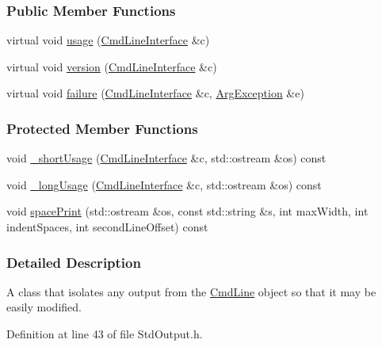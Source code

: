 \subsubsection*{Public Member Functions}
\begin{DoxyCompactItemize}
\item 
virtual void \hyperlink{classTCLAP_1_1StdOutput_aeb10eb400e0ee45f2cde689bef606b49}{usage} (\hyperlink{classTCLAP_1_1CmdLineInterface}{Cmd\+Line\+Interface} \&c)
\item 
virtual void \hyperlink{classTCLAP_1_1StdOutput_a768111a59af4753ac6e5ace3ec99482e}{version} (\hyperlink{classTCLAP_1_1CmdLineInterface}{Cmd\+Line\+Interface} \&c)
\item 
virtual void \hyperlink{classTCLAP_1_1StdOutput_a9afc267e012c3ac42c8b1afe01f98556}{failure} (\hyperlink{classTCLAP_1_1CmdLineInterface}{Cmd\+Line\+Interface} \&c, \hyperlink{classTCLAP_1_1ArgException}{Arg\+Exception} \&e)
\end{DoxyCompactItemize}
\subsubsection*{Protected Member Functions}
\begin{DoxyCompactItemize}
\item 
void \hyperlink{classTCLAP_1_1StdOutput_a60fa57587838d506d907f08800f2631c}{\+\_\+short\+Usage} (\hyperlink{classTCLAP_1_1CmdLineInterface}{Cmd\+Line\+Interface} \&c, std\+::ostream \&os) const 
\item 
void \hyperlink{classTCLAP_1_1StdOutput_ace725aebd685c16f464d697e85e0327d}{\+\_\+long\+Usage} (\hyperlink{classTCLAP_1_1CmdLineInterface}{Cmd\+Line\+Interface} \&c, std\+::ostream \&os) const 
\item 
void \hyperlink{classTCLAP_1_1StdOutput_a38661be8895e07c442c2c3138b7444a2}{space\+Print} (std\+::ostream \&os, const std\+::string \&s, int max\+Width, int indent\+Spaces, int second\+Line\+Offset) const 
\end{DoxyCompactItemize}


\subsubsection{Detailed Description}
A class that isolates any output from the \hyperlink{classTCLAP_1_1CmdLine}{Cmd\+Line} object so that it may be easily modified. 

Definition at line 43 of file Std\+Output.\+h.



